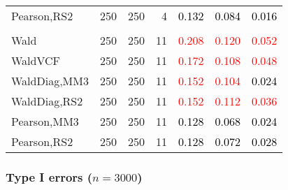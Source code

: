 \documentclass[
]{article}
\begin{document}
\begin{table}[H]
{\begin{tabular}[t]{lrrrrrr}
\hspace{1em}Pearson,RS2 & 250 & 250 & 4 & \textcolor{black}{0.132} & \textcolor{black}{0.084} & \textcolor{black}{0.016}\\
\addlinespace[0.3em]
\multicolumn{7}{l}{\textbf{3F 15V}}\\
\hspace{1em}Wald & 250 & 250 & 11 & \textcolor{red}{0.208} & \textcolor{red}{0.120} & \textcolor{red}{0.052}\\
\hspace{1em}WaldVCF & 250 & 250 & 11 & \textcolor{red}{0.172} & \textcolor{red}{0.108} & \textcolor{red}{0.048}\\
\hspace{1em}WaldDiag,MM3 & 250 & 250 & 11 & \textcolor{red}{0.152} & \textcolor{red}{0.104} & \textcolor{black}{0.024}\\
\hspace{1em}WaldDiag,RS2 & 250 & 250 & 11 & \textcolor{red}{0.152} & \textcolor{red}{0.112} & \textcolor{red}{0.036}\\
\hspace{1em}Pearson,MM3 & 250 & 250 & 11 & \textcolor{black}{0.128} & \textcolor{black}{0.068} & \textcolor{black}{0.024}\\
\hspace{1em}Pearson,RS2 & 250 & 250 & 11 & \textcolor{black}{0.128} & \textcolor{black}{0.072} & \textcolor{black}{0.028}\\
\bottomrule
\end{tabular}}
\endgroup{}
\end{table}

\hypertarget{type-i-errors-n3000-2}{%
\subsubsection{\texorpdfstring{Type I errors
(\(n=3000\))}{Type I errors (n=3000)}}\label{type-i-errors-n3000-2}}
\end{document}
